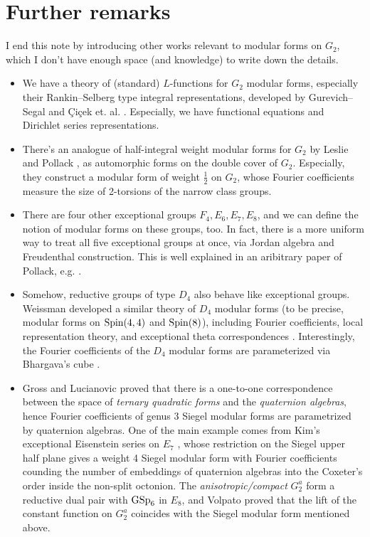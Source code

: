 \section{Further remarks}
\label{sec:further}

I end this note by introducing other works relevant to modular forms on $G_2$, which I don't have enough space (and knowledge) to write down the details.

\begin{itemize}
    \item We have a theory of (standard) $L$-functions for $G_2$ modular forms, especially their Rankin--Selberg type integral representations, developed by Gurevich--Segal \cite{gurevich2015rankin} and \c{C}i\c{c}ek et. al. \cite{cicek2022completed}.
    Especially, we have functional equations and Dirichlet series representations.
    \item There's an analogue of half-integral weight modular forms for $G_2$ by Leslie and Pollack \cite{leslie2024modular}, as automorphic forms on the double cover of $G_2$.
    Especially, they construct a modular form of weight $\frac{1}{2}$ on $G_2$, whose Fourier coefficients measure the size of 2-torsions of the narrow class groups.
    \item There are four other exceptional groups $F_4, E_6, E_7, E_8$, and we can define the notion of modular forms on these groups, too.
    In fact, there is a more uniform way to treat all five exceptional groups at once, via Jordan algebra and Freudenthal construction.
    This is well explained in an aribitrary paper of Pollack, e.g. \cite{pollack2020fourier}.
    \item Somehow, reductive groups of type $D_4$ also behave like exceptional groups.
    Weissman developed a similar theory of $D_4$ modular forms (to be precise, modular forms on $\mathrm{Spin}(4, 4)$ and $\mathrm{Spin}(8)$), including Fourier coefficients, local representation theory, and exceptional theta correspondences \cite{weissman2006d}.
    Interestingly, the Fourier coefficients of the $D_4$ modular forms are parameterized via Bhargava's cube \cite{bhargava2004higherI}.
    \item
    Gross and Lucianovic \cite{lucianovic2003quaternion,gross1996quaternionic} proved that there is a one-to-one correspondence between the space of \emph{ternary quadratic forms} and the \emph{quaternion algebras}, hence Fourier coefficients of genus 3 Siegel modular forms are parametrized by quaternion algebras.
    One of the main example comes from Kim's exceptional Eisenstein series on $E_7$ \cite{kim1992exceptional}, whose restriction on the Siegel upper half plane gives a weight 4 Siegel modular form with Fourier coefficients counding the number of embeddings of quaternion algebras into the Coxeter's order inside the non-split octonion.
    The \emph{anisotropic/compact} $G_2^a$ form a reductive dual pair with $\mathrm{GSp}_{6}$ in $E_8$,  and Volpato \cite{volpato2008some} proved that the lift of the constant function on $G_2^a$ coincides with the Siegel modular form mentioned above.
    
\end{itemize}
